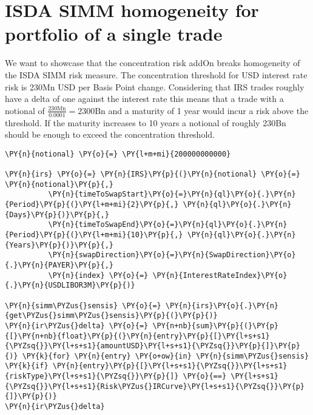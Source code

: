     

    
    \hypertarget{isda-simm-homogeneity-for-portfolio-of-a-single-trade}{%
\section{ISDA SIMM homogeneity for portfolio of a single
trade}\label{isda-simm-homogeneity-for-portfolio-of-a-single-trade}}

    We want to showcase that the concentration risk addOn breaks homogeneity
of the \gls{ISDA SIMM} risk measure. The concentration threshold for USD
interest rate risk is 230Mn USD per Basis Point change. Considering that
IRS trades roughly have a delta of one against the interest rate this
means that a trade with a notional of
\(\frac{230\text{Mn}}{0.0001} = 2300\text{Bn}\) and a maturity of 1 year
would incur a risk above the threshold. If the maturity increases to 10
years a notional of roughly 230Bn should be enough to exceed the
concentration threshold.

    \begin{tcolorbox}[breakable, size=fbox, boxrule=1pt, pad at break*=1mm,colback=cellbackground, colframe=cellborder]
\begin{Verbatim}[commandchars=\\\{\}]
\PY{n}{notional} \PY{o}{=} \PY{l+m+mi}{200000000000}

\PY{n}{irs} \PY{o}{=} \PY{n}{IRS}\PY{p}{(}\PY{n}{notional} \PY{o}{=} \PY{n}{notional}\PY{p}{,}
          \PY{n}{timeToSwapStart}\PY{o}{=}\PY{n}{ql}\PY{o}{.}\PY{n}{Period}\PY{p}{(}\PY{l+m+mi}{2}\PY{p}{,} \PY{n}{ql}\PY{o}{.}\PY{n}{Days}\PY{p}{)}\PY{p}{,}
          \PY{n}{timeToSwapEnd}\PY{o}{=}\PY{n}{ql}\PY{o}{.}\PY{n}{Period}\PY{p}{(}\PY{l+m+mi}{10}\PY{p}{,} \PY{n}{ql}\PY{o}{.}\PY{n}{Years}\PY{p}{)}\PY{p}{,}
          \PY{n}{swapDirection}\PY{o}{=}\PY{n}{SwapDirection}\PY{o}{.}\PY{n}{PAYER}\PY{p}{,}
          \PY{n}{index} \PY{o}{=} \PY{n}{InterestRateIndex}\PY{o}{.}\PY{n}{USDLIBOR3M}\PY{p}{)}

\PY{n}{simm\PYZus{}sensis} \PY{o}{=} \PY{n}{irs}\PY{o}{.}\PY{n}{get\PYZus{}simm\PYZus{}sensis}\PY{p}{(}\PY{p}{)}
\PY{n}{ir\PYZus{}delta} \PY{o}{=} \PY{n+nb}{sum}\PY{p}{(}\PY{p}{[}\PY{n+nb}{float}\PY{p}{(}\PY{n}{entry}\PY{p}{[}\PY{l+s+s1}{\PYZsq{}}\PY{l+s+s1}{amountUSD}\PY{l+s+s1}{\PYZsq{}}\PY{p}{]}\PY{p}{)} \PY{k}{for} \PY{n}{entry} \PY{o+ow}{in} \PY{n}{simm\PYZus{}sensis} \PY{k}{if} \PY{n}{entry}\PY{p}{[}\PY{l+s+s1}{\PYZsq{}}\PY{l+s+s1}{riskType}\PY{l+s+s1}{\PYZsq{}}\PY{p}{]} \PY{o}{==} \PY{l+s+s1}{\PYZsq{}}\PY{l+s+s1}{Risk\PYZus{}IRCurve}\PY{l+s+s1}{\PYZsq{}}\PY{p}{]}\PY{p}{)}
\PY{n}{ir\PYZus{}delta}
\end{Verbatim}
\end{tcolorbox}

